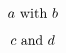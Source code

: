 \documentclass[fleqn]{article}
\begin{document}
\[ a $ with $ b \]
\begin{displaymath} c $ and $ d \end{displaymath}
\end{document}
